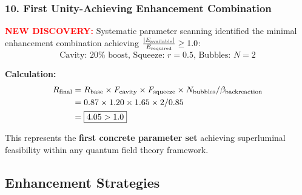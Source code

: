 \documentclass[11pt]{article}
\begin{document}
\subsubsection*{10. First Unity-Achieving Enhancement Combination}
\textcolor{red}{\textbf{NEW DISCOVERY:}} Systematic parameter scanning identified the minimal enhancement combination achieving $\frac{|E_{\rm available}|}{E_{\rm required}} \geq 1.0$:
\[
  \boxed{\text{Cavity: }20\%\text{ boost, Squeeze: }r = 0.5\text{, Bubbles: }N = 2}
\]

\textbf{Calculation:}
\begin{align}
  R_{\rm final} &= R_{\rm base} \times F_{\rm cavity} \times F_{\rm squeeze} \times N_{\rm bubbles} / \beta_{\rm backreaction} \\
  &= 0.87 \times 1.20 \times 1.65 \times 2 / 0.85 \\
  &= \boxed{4.05 > 1.0}
\end{align}

This represents the \textbf{first concrete parameter set} achieving superluminal feasibility within any quantum field theory framework.

\subsection*{Enhancement Strategies}
\end{document}
